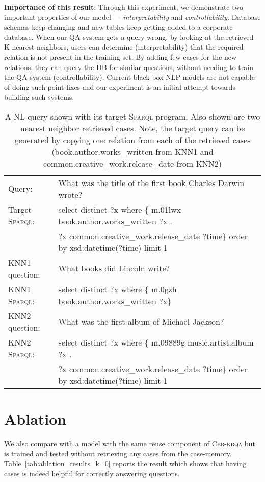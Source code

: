 \documentclass{article}
\newcommand{\spql}{\textsc{Sparql}\xspace}
\newcommand{\alg}{\textsc{Cbr-kbqa}\xspace}
\begin{document}
\textbf{Importance of this result}: Through this experiment, we demonstrate two important properties of our model --- \emph{interpretability} and \emph{controllability}. Database schemas keep changing and new tables keep getting added to a corporate database. When our QA system gets a query wrong, by looking at the retrieved K-nearest neighbors, users can determine (interpretability) that the required relation is not present in the training set. By adding few cases for the new relations, they can query the DB for similar questions, without needing to train the QA system (controllability). Current black-box NLP models are not capable of doing such point-fixes and our experiment is an initial attempt towards building such systems. 


\begin{table}
    \centering
    \begin{tabular}{l l}\toprule
      Query: &  What was the title of the first book Charles Darwin wrote?\\
    Target \spql: & \textsf{select distinct ?x where \{ m.01lwx book.author.works\_written ?x . }\\  & \textsf{?x common.creative\_work.release\_date ?time\} order by xsd:datetime(?time) limit 1}\\\midrule
    KNN1 question: & What books did Lincoln write? \\
    KNN1 \spql: & \textsf{select distinct ?x where \{ m.0gzh book.author.works\_written ?x\}}\\\midrule
    KNN2 question: & What was the first album of Michael Jackson? \\
    KNN2 \spql: & \textsf{select distinct ?x where \{ m.09889g music.artist.album ?x .}\\
    & \textsf{?x common.creative\_work.release\_date ?time\} order by xsd:datetime(?time) limit 1}\\\bottomrule
    \end{tabular}
    \caption{A NL query shown with its target \spql program. Also shown are two nearest neighbor retrieved cases. Note, the target query can be generated by copying one relation from each of the retrieved cases (\textsf{book.author.works\_written} from KNN1 and \textsf{common.creative\_work.release\_date} from KNN2)}
    \label{tab:knn_eg_1}
\end{table}



\section{Ablation}
We also compare with a model with the same reuse component of \alg but is trained and tested without retrieving any cases from the case-memory. Table~\ref{tab:ablation_results_k=0} reports the result which shows that having cases is indeed helpful for correctly answering questions.
\end{document}
